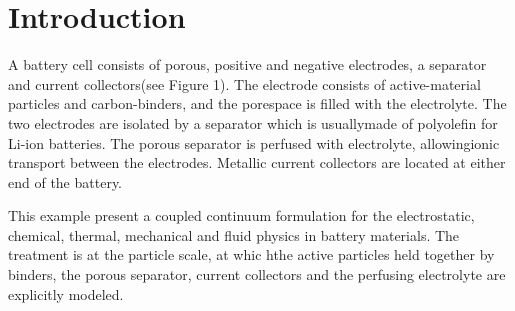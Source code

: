 \hypertarget{growth_Introduction}{}\section{Introduction}\label{growth_Introduction}
A battery cell consists of porous, positive and negative electrodes, a separator and current collectors(see Figure 1). The electrode consists of active-\/material particles and carbon-\/binders, and the porespace is filled with the electrolyte. The two electrodes are isolated by a separator which is usuallymade of polyolefin for Li-\/ion batteries. The porous separator is perfused with electrolyte, allowingionic transport between the electrodes. Metallic current collectors are located at either end of the battery.

This example present a coupled continuum formulation for the electrostatic, chemical, thermal, mechanical and fluid physics in battery materials. The treatment is at the particle scale, at whic hthe active particles held together by binders, the porous separator, current collectors and the perfusing electrolyte are explicitly modeled.

